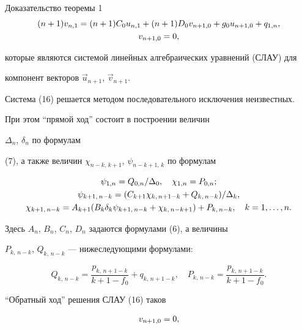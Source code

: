 \begin{pf*}{Доказательство теоремы 1}
\begin{gather}
(n+1)v_{n,1}=(n+1)C_0u_{n,1}+(n+1)D_0v_{n+1,0}+


g_0u_{n+1,0}+q_{1,n},\notag\\


v_{n+1,0}=0,\notag


\end{gather}


которые являются системой линейных алгебраических уравнений (СЛАУ) для


компонент векторов $\Vec u_{n+1}$, $\Vec v_{n+1}$.





Система (16) решается методом последовательного исключения неизвестных.


При этом ``прямой ход'' состоит в построении величин


$\Delta_n$, $\delta_n$ по формулам


(7), а также величин $\chi_{n-k,\,k+1}$, $\psi_{n-k+1,\,k}$ по формулам


\begin{gather}


\psi_{1,n}=Q_{0,n}/\Delta_0,\quad \chi_{1,n}=P_{0,n};\notag\\


\psi_{k+1,\,n-k}=(C_{k+1}\chi_{k,\,n+1-k}+Q_{k,\,n-k})/\Delta_k,\\


\chi_{k+1,\,n-k}=A_{k+1}(B_k\delta_k\psi_{k+1,\,n-k}+


\chi_{k,\,n-k+1})+P_{k,\,n-k},\quad k=1,\dotsc,n.\notag


\end{gather}


Здесь $A_n$, $B_n$, $C_n$, $D_n$ задаются формулами (6), а величины


$P_{k,\,n-k}$, $Q_{k,\,n-k}$ --- нижеследующими формулами:


$$


Q_{k,\,n-k}=\frac{p_{k,\,n+1-k}}{k+1-f_0}+


q_{k,\,n+1-k},\quad


P_{k,\,n-k}=\frac{p_{k,\,n+1-k}}{k+1-f_0}.


$$





``Обратный ход'' решения СЛАУ (16) таков


\begin{gather}


v_{n+1,0}=0,\notag\\



\end{gather}
\end{pf*}

